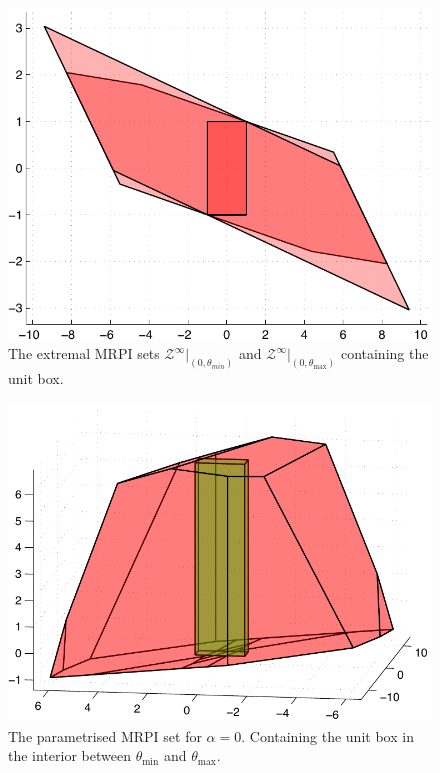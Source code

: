 \documentclass[letterpaper, 10pt, conference]{ieeeconf} %
\begin{document}
\begin{figure}
\centerline{\includegraphics[scale=0.6]{twoDimensional}}
\caption{The extremal MRPI sets $\mathcal Z^\infty\vert_{(0,\theta_{min})}$ and $\mathcal Z^\infty
\vert_{(0,\theta_{\max})}$ containing the unit box.}
\label{fig:two:dim:example}
\end{figure}
\begin{figure}
\centerline{\includegraphics[scale=0.6]{threeDimensional}}
\caption{The parametrised MRPI set for $\alpha=0$. Containing the unit box in the 
interior between $\theta_{\min}$ and $\theta_{\max}$.}
\label{fig:three:dim:example}
\end{figure}
%
%
%
\end{document}
